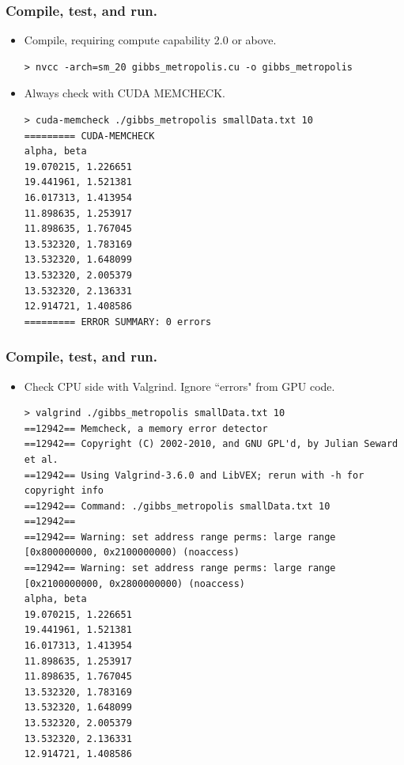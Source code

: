 \documentclass[handout]{beamer}
\numberwithin{equation}{section}
\begin{document}
\begin{frame}[fragile]
\frametitle{Compile, test, and run.}
\begin{itemize}
\item Compile, requiring compute capability 2.0 or above. 
\begin{lstlisting}
> nvcc -arch=sm_20 gibbs_metropolis.cu -o gibbs_metropolis
\end{lstlisting}
\pause \item Always check with CUDA MEMCHECK.
\begin{lstlisting}
> cuda-memcheck ./gibbs_metropolis smallData.txt 10
========= CUDA-MEMCHECK
alpha, beta
19.070215, 1.226651
19.441961, 1.521381
16.017313, 1.413954
11.898635, 1.253917
11.898635, 1.767045
13.532320, 1.783169
13.532320, 1.648099
13.532320, 2.005379
13.532320, 2.136331
12.914721, 1.408586
========= ERROR SUMMARY: 0 errors 
\end{lstlisting}
\end{itemize}
\end{frame}

\begin{frame}[fragile]
\frametitle{Compile, test, and run.}
\begin{itemize}
\item Check CPU side with Valgrind. Ignore ``errors" from GPU code.
\begin{lstlisting}
> valgrind ./gibbs_metropolis smallData.txt 10
==12942== Memcheck, a memory error detector
==12942== Copyright (C) 2002-2010, and GNU GPL'd, by Julian Seward et al.
==12942== Using Valgrind-3.6.0 and LibVEX; rerun with -h for copyright info
==12942== Command: ./gibbs_metropolis smallData.txt 10
==12942== 
==12942== Warning: set address range perms: large range [0x800000000, 0x2100000000) (noaccess)
==12942== Warning: set address range perms: large range [0x2100000000, 0x2800000000) (noaccess)
alpha, beta
19.070215, 1.226651
19.441961, 1.521381
16.017313, 1.413954
11.898635, 1.253917
11.898635, 1.767045
13.532320, 1.783169
13.532320, 1.648099
13.532320, 2.005379
13.532320, 2.136331
12.914721, 1.408586
\end{lstlisting}
\end{itemize}
\end{frame}
\end{document}
